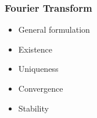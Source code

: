 \documentclass[11pt, oneside]{article}   	%
\newtheorem{definition}{Definition}
\begin{document}
\subsubsection{Fourier Transform}
\begin{itemize}
\item General formulation
\item Existence
\item Uniqueness
\item Convergence
\item Stability
\end{itemize}
\end{document}
